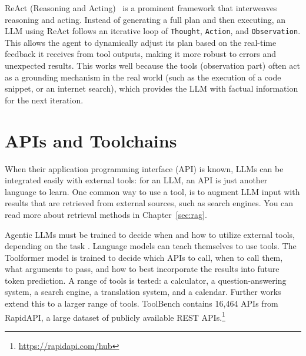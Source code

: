ReAct (Reasoning and Acting)~\citep{yao2022react} is a prominent framework that interweaves reasoning and acting. Instead of generating a full plan and then executing, an LLM using ReAct follows an iterative loop of \texttt{Thought}, \texttt{Action}, and \texttt{Observation}. This allows the agent to dynamically adjust its plan based on the real-time feedback it receives from tool outputs, making it more robust to errors and unexpected results. This works well because the tools (observation part) often act as a grounding mechanism in the real world (such as the execution of a code snippet, or an internet search), which provides the LLM with factual information for the next iteration.


\section{APIs and Toolchains}


When their application programming interface (API) is known,  LLMs can be integrated easily with external tools: for an LLM, an API is just another language to learn. 
One common way to use a tool, is to augment LLM input with results that are retrieved from external sources, such as search engines. You can read more about retrieval methods in Chapter~\ref{sec:rag}.

Agentic LLMs must be trained to decide when and how to  utilize external tools, depending on the  task \citep{shen2024small}.
%
%
Language models can teach themselves to use tools.
The Toolformer model \citep{schick2023toolformer} is trained to decide which APIs to call, when to call them, what arguments to pass, and how to best incorporate the results into future token prediction. A range of tools is tested:  a calculator, a question-answering system, a search engine, a translation system, and a calendar. Further works extend this to a larger range of tools. 
%
ToolBench \citep{qin2023toolllm} contains 16,464 APIs from RapidAPI, a
large dataset of publicly available REST APIs.\footnote{ \url{https://rapidapi.com/hub}}

